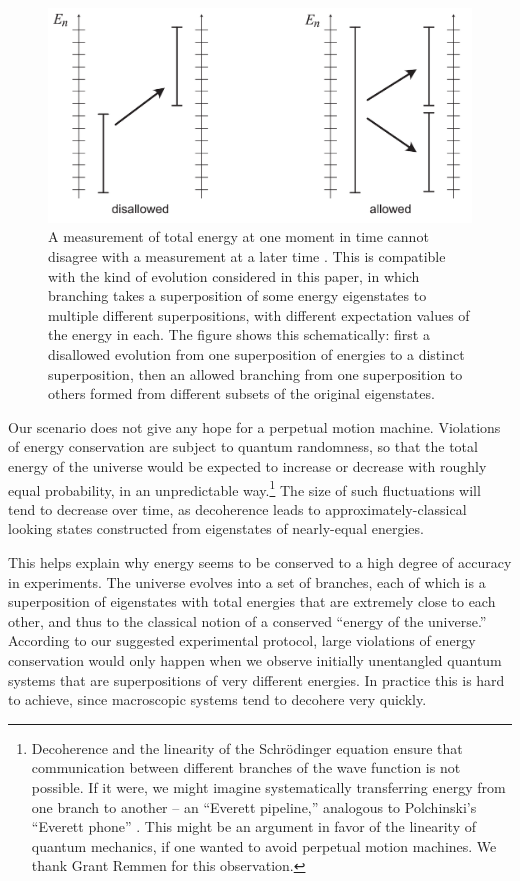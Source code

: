 \documentclass[aps,prd,onecolumn,nofootinbib,notitlepage]{revtex4-1}
\begin{document}
\begin{figure}[h]
\centering
\includegraphics[width=.6\textwidth]{allowed.pdf}
\caption{A measurement of total energy at one moment in time cannot disagree with a measurement at a later time \cite{griffiths,hartle1995conservation}.
This is compatible with the kind of evolution considered in this paper, in which branching takes a superposition of some energy eigenstates to multiple different superpositions, with different expectation values of the energy in each.
The figure shows this schematically: first a disallowed evolution from one superposition of energies to a distinct superposition, then an allowed branching from one superposition to others formed from different subsets of the original eigenstates.}
\label{fig:allowed}
\end{figure}

Our scenario does not give any hope for a perpetual motion machine.
Violations of energy conservation are subject to quantum randomness, so that the total energy of the universe would be expected to increase or decrease with roughly equal probability, in an unpredictable way.\footnote{Decoherence and the linearity of the Schr\"odinger equation ensure that communication between different branches of the wave function is not possible. If it were, we might imagine systematically transferring energy from one branch to another -- an ``Everett pipeline,'' analogous to Polchinski's ``Everett phone'' \cite{Polchinski:1990py}. This might be an argument in favor of the linearity of quantum mechanics, if one wanted to avoid perpetual motion machines. We thank Grant Remmen for this observation.}
The size of such fluctuations will tend to decrease over time, as decoherence leads to approximately-classical looking states constructed from eigenstates of nearly-equal energies.

This helps explain why energy seems to be conserved to a high degree of accuracy in experiments.
The universe evolves into a set of branches, each of which is a superposition of eigenstates with total energies that are extremely close to each other, and thus to the classical notion of a conserved ``energy of the universe.''
According to our suggested experimental protocol, large violations of energy conservation would only happen when we observe initially unentangled quantum systems that are superpositions of very different energies.
In practice this is hard to achieve, since macroscopic systems tend to decohere very quickly.
\end{document}
